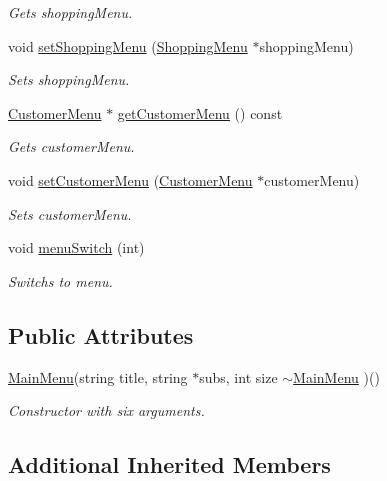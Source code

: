 \begin{DoxyCompactItemize}
\begin{DoxyCompactList}\small\item\em Gets shopping\+Menu. \end{DoxyCompactList}\item 
void \hyperlink{classMainMenu_ae8cab8d0e2430d34bad64ba238b4cc4d}{set\+Shopping\+Menu} (\hyperlink{classShoppingMenu}{Shopping\+Menu} $\ast$shopping\+Menu)
\begin{DoxyCompactList}\small\item\em Sets shopping\+Menu. \end{DoxyCompactList}\item 
\hyperlink{classCustomerMenu}{Customer\+Menu} $\ast$ \hyperlink{classMainMenu_ac8c258825449e5c4cc129004fb2e6589}{get\+Customer\+Menu} () const 
\begin{DoxyCompactList}\small\item\em Gets customer\+Menu. \end{DoxyCompactList}\item 
void \hyperlink{classMainMenu_a5c80f2e447ac6fca73b1527f9abd74b6}{set\+Customer\+Menu} (\hyperlink{classCustomerMenu}{Customer\+Menu} $\ast$customer\+Menu)
\begin{DoxyCompactList}\small\item\em Sets customer\+Menu. \end{DoxyCompactList}\item 
void \hyperlink{classMainMenu_aabbf0c8aba7bc80316e150ea609e897f}{menu\+Switch} (int)
\begin{DoxyCompactList}\small\item\em Switchs to menu. \end{DoxyCompactList}\end{DoxyCompactItemize}
\subsection*{Public Attributes}
\begin{DoxyCompactItemize}
\item 
\hyperlink{classMainMenu}{Main\+Menu}(string title, string $\ast$subs, int size \hyperlink{classMainMenu_a70561c3a6ca04aaa2d7a28d4b157a462}{$\sim$\+Main\+Menu} )()
\begin{DoxyCompactList}\small\item\em Constructor with six arguments. \end{DoxyCompactList}\end{DoxyCompactItemize}
\subsection*{Additional Inherited Members}


